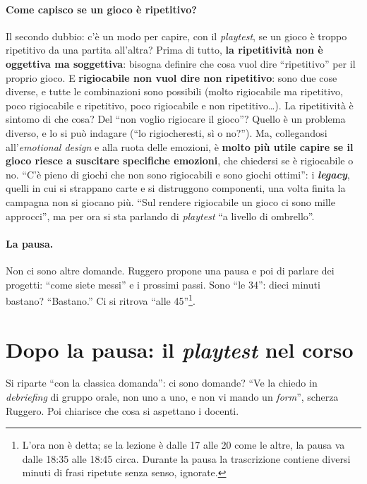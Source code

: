 \paragraph{Come capisco se un gioco è ripetitivo?} Il secondo dubbio: c'è un modo per
capire, con il \emph{playtest}, se un gioco è troppo ripetitivo da una partita all'altra?
Prima di tutto, \textbf{la ripetitività non è oggettiva ma soggettiva}: bisogna definire
che cosa vuol dire ``ripetitivo'' per il proprio gioco. E \textbf{rigiocabile non vuol
dire non ripetitivo}: sono due cose diverse, e tutte le combinazioni sono possibili
(molto rigiocabile ma ripetitivo, poco rigiocabile e ripetitivo, poco rigiocabile e non
ripetitivo\ldots). La ripetitività è sintomo di che cosa? Del ``non voglio rigiocare il
gioco''? Quello è un problema diverso, e lo si può indagare (``lo rigiocheresti, sì o
no?''). Ma, collegandosi all'\emph{emotional design} e alla ruota delle emozioni, è
\textbf{molto più utile capire se il gioco riesce a suscitare specifiche emozioni}, che
chiedersi se è rigiocabile o no. ``C'è pieno di giochi che non sono rigiocabili e sono
giochi ottimi'': i \textbf{\emph{legacy}}, quelli in cui si strappano carte e si
distruggono componenti, una volta finita la campagna non si giocano più. ``Sul rendere
rigiocabile un gioco ci sono mille approcci'', ma per ora si sta parlando di
\emph{playtest} ``a livello di ombrello''.

\paragraph{La pausa.} Non ci sono altre domande. Ruggero propone una pausa e poi di
parlare dei progetti: ``come siete messi'' e i prossimi passi. Sono ``le 34'': dieci
minuti bastano? ``Bastano.'' Ci si ritrova ``alle 45''\footnote{L'ora non è detta; se la
lezione è dalle 17 alle 20 come le altre, la pausa va dalle 18:35 alle 18:45 circa.
Durante la pausa la trascrizione contiene diversi minuti di frasi ripetute senza senso,
ignorate.}.

\section{Dopo la pausa: il \emph{playtest} nel corso}
\label{a12:sec:playtestcorso}

Si riparte ``con la classica domanda'': ci sono domande? ``Ve la chiedo in
\emph{debriefing} di gruppo orale, non uno a uno, e non vi mando un \emph{form}'', scherza
Ruggero. Poi chiarisce che cosa si aspettano i docenti.


